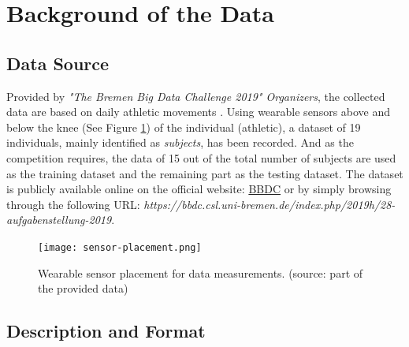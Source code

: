 %
%
%
%
%
%


\section{Background of the Data}
\subsection{Data Source}

Provided by \emph{"The Bremen Big Data Challenge 2019" Organizers}, the collected data are based on
daily athletic movements \parencite{bbdc}. Using wearable sensors above and below the knee (See
Figure \ref{fig:sensor-placement}) of the individual (athletic), a dataset of 19 individuals, mainly
identified as \emph{subjects}, has been recorded. And as the competition requires, the data of 15
out of the total number of subjects are used as the training dataset and the remaining part as the
testing dataset. The dataset is publicly available online on the official website:
\href{https://bbdc.csl.uni-bremen.de/images/2019/bbdc_2019_Bewegungsdaten_mit_referenz.zip}{BBDC} or
by simply browsing through the following URL: \emph{https://bbdc.csl.uni-bremen.de/index.php/2019h/28-aufgabenstellung-2019}.

\begin{figure}
    \centering
    \texttt{[image: sensor-placement.png]}
    \caption{Wearable sensor placement for data measurements. (source: part of the provided data)}
    \label{fig:sensor-placement}
\end{figure}

\subsection{Description and Format}

